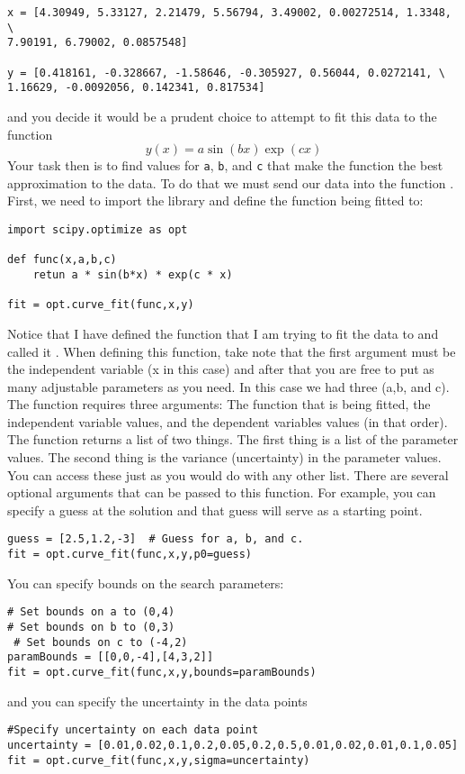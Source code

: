 \begin{Verbatim}
x = [4.30949, 5.33127, 2.21479, 5.56794, 3.49002, 0.00272514, 1.3348, \
7.90191, 6.79002, 0.0857548]

y = [0.418161, -0.328667, -1.58646, -0.305927, 0.56044, 0.0272141, \
1.16629, -0.0092056, 0.142341, 0.817534]
\end{Verbatim}
and you decide it would be a prudent choice to attempt to fit this
data to the function
\begin{equation}
y(x)  = a \sin(b x) \exp(c x)
\end{equation}
Your task then is to find values for \texttt{a}, \texttt{b}, and
\texttt{c} that make the function the best approximation to the data.
To do that we must send our data into the function
\code{curve\_fit}. First, we need to import the library and define the
function being fitted to:
\begin{Verbatim}
import scipy.optimize as opt

def func(x,a,b,c)
    retun a * sin(b*x) * exp(c * x)

fit = opt.curve_fit(func,x,y)
\end{Verbatim}
Notice that I have defined the function that I am trying to fit the
data to and called it .  When defining this function,
take note that the first argument must be the independent variable (x
in this case) and after that you are free to put as many adjustable
parameters as you need.  In this case we had three (a,b, and c).  The
\code{curve\_fit} function requires three arguments: The function that
is being fitted, the independent variable values, and the dependent
variables values (in that order).  
The \code{curve\_fit} function returns a list of two things.  The
first thing is a list of the parameter values.  The second thing is
the variance (uncertainty) in the parameter values.  You can access
these just as you would do with any other list.
There are several optional arguments that can be passed to
this function.  For example, you can specify a guess at the solution
and that guess will serve as a starting point.
\begin{Verbatim}
guess = [2.5,1.2,-3]  # Guess for a, b, and c.
fit = opt.curve_fit(func,x,y,p0=guess)
\end{Verbatim}
You can specify bounds on the search parameters:
\begin{Verbatim}
# Set bounds on a to (0,4)
# Set bounds on b to (0,3)
 # Set bounds on c to (-4,2)
paramBounds = [[0,0,-4],[4,3,2]] 
fit = opt.curve_fit(func,x,y,bounds=paramBounds)
\end{Verbatim}
and you can specify the uncertainty in the data points
\begin{Verbatim}
#Specify uncertainty on each data point
uncertainty = [0.01,0.02,0.1,0.2,0.05,0.2,0.5,0.01,0.02,0.01,0.1,0.05]  
fit = opt.curve_fit(func,x,y,sigma=uncertainty)
\end{Verbatim}

